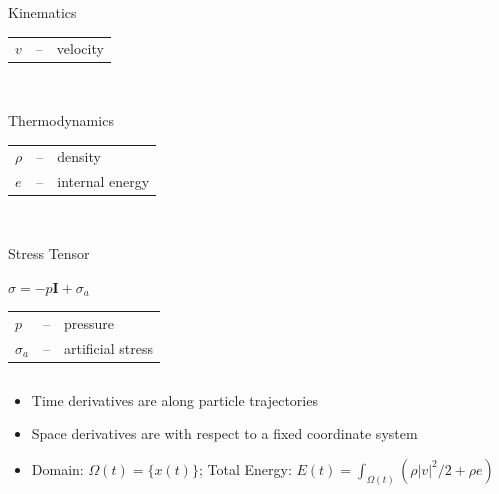 \documentclass[8pt,xcolor=svgnames]{beamer}
\newcommand{\myem}[1]{{\textcolor{myorange}{#1}}}
\begin{document}
\begin{frame}
\begin{columns}
\begin{column}{0.35\textwidth}
\begin{center}
\begin{minipage}{0.7\textwidth}
\begin{block}{\small Kinematics}
\begin{tabular}{lcl}
$v$ & -- & velocity \\
\end{tabular}
\end{block}
\end{minipage}\\
\begin{minipage}{0.9\textwidth}
\begin{block}{\small Thermodynamics}
\begin{tabular}{lcl}
$\rho$ & -- & density \\
$e$ & -- & internal energy \\
\end{tabular}
\end{block}
\end{minipage}\\
\begin{minipage}{1.0\textwidth}
\begin{block}{\small Stress Tensor}
\begin{center}
$\sigma = -p \mathbf{I} + \sigma_{a} $
\end{center}
\begin{tabular}{lcl}
$p$ & -- & pressure \\
$\sigma_{a}$ & -- & artificial stress \\
\end{tabular}
\end{block}
\end{minipage}
\end{center}
\end{column}
\end{columns}

\bigskip

\begin{itemize}
\item Time derivatives are along particle trajectories
\item Space derivatives are with respect to a fixed coordinate system
\item \myem{Domain}: $\Omega(t)=\{x(t)\}$;
      \myem{Total Energy}: $E(t)=\int_{\Omega(t)} (\rho |v|^2/2 + \rho e)$
\end{itemize}
\end{frame}

\end{document}
